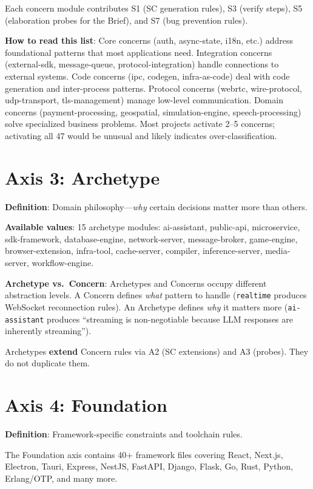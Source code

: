 \documentclass[11pt,a4paper,openright,twoside]{report}
\begin{document}
Each concern module contributes S1 (SC generation rules), S3 (verify steps), S5 (elaboration probes for the Brief), and S7 (bug prevention rules).

\textbf{How to read this list}: Core concerns (auth, async-state, i18n, etc.) address foundational patterns that most applications need. Integration concerns (external-sdk, message-queue, protocol-integration) handle connections to external systems. Code concerns (ipc, codegen, infra-as-code) deal with code generation and inter-process patterns. Protocol concerns (webrtc, wire-protocol, udp-transport, tls-management) manage low-level communication. Domain concerns (payment-processing, geospatial, simulation-engine, speech-processing) solve specialized business problems. Most projects activate 2--5 concerns; activating all 47 would be unusual and likely indicates over-classification.

\section{Axis 3: Archetype}

\textbf{Definition}: Domain philosophy---\emph{why} certain decisions matter more than others.

\textbf{Available values}: 15 archetype modules: ai-assistant, public-api, microservice, sdk-framework, database-engine, network-server, message-broker, game-engine, browser-extension, infra-tool, cache-server, compiler, inference-server, media-server, workflow-engine.

\textbf{Archetype vs.\ Concern}: Archetypes and Concerns occupy different abstraction levels. A Concern defines \emph{what} pattern to handle (\texttt{realtime} produces WebSocket reconnection rules). An Archetype defines \emph{why} it matters more (\texttt{ai-assistant} produces ``streaming is non-negotiable because LLM responses are inherently streaming'').

Archetypes \textbf{extend} Concern rules via A2 (SC extensions) and A3 (probes). They do not duplicate them.

\section{Axis 4: Foundation}

\textbf{Definition}: Framework-specific constraints and toolchain rules.

The Foundation axis contains 40+ framework files covering React, Next.js, Electron, Tauri, Express, NestJS, FastAPI, Django, Flask, Go, Rust, Python, Erlang/OTP, and many more.
\end{document}
